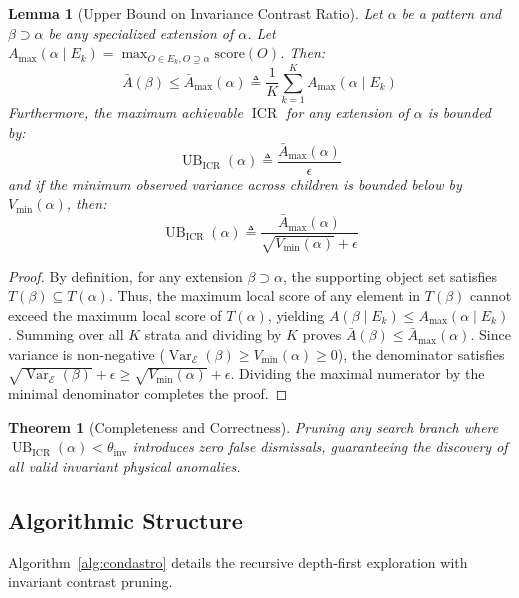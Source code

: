 \documentclass[10pt,a4paper]{article}
\newtheorem{lemma}{Lemma}
\newtheorem{theorem}{Theorem}
\begin{document}
\begin{lemma}[Upper Bound on Invariance Contrast Ratio]
\label{lem:bound}
Let $\alpha$ be a pattern and $\beta \supset \alpha$ be any specialized extension of $\alpha$. Let $A_{\max}(\alpha \mid E_k) = \max_{O \in E_k, O \supseteq \alpha} \text{score}(O)$. Then:
\begin{equation}
    \bar{A}(\beta) \le \bar{A}_{\max}(\alpha) \triangleq \frac{1}{K} \sum_{k=1}^K A_{\max}(\alpha \mid E_k)
\end{equation}
Furthermore, the maximum achievable $\operatorname{ICR}$ for any extension of $\alpha$ is bounded by:
\begin{equation}
    \operatorname{UB}_{\text{ICR}}(\alpha) \triangleq \frac{\bar{A}_{\max}(\alpha)}{\epsilon}
\end{equation}
and if the minimum observed variance across children is bounded below by $V_{\min}(\alpha)$, then:
\begin{equation}
    \operatorname{UB}_{\text{ICR}}(\alpha) \triangleq \frac{\bar{A}_{\max}(\alpha)}{\sqrt{V_{\min}(\alpha)} + \epsilon}
\end{equation}
\end{lemma}

\begin{proof}
By definition, for any extension $\beta \supset \alpha$, the supporting object set satisfies $T(\beta) \subseteq T(\alpha)$. Thus, the maximum local score of any element in $T(\beta)$ cannot exceed the maximum local score of $T(\alpha)$, yielding $A(\beta \mid E_k) \le A_{\max}(\alpha \mid E_k)$. Summing over all $K$ strata and dividing by $K$ proves $\bar{A}(\beta) \le \bar{A}_{\max}(\alpha)$. Since variance is non-negative ($\operatorname{Var}_{\mathcal{E}}(\beta) \ge V_{\min}(\alpha) \ge 0$), the denominator satisfies $\sqrt{\operatorname{Var}_{\mathcal{E}}(\beta)} + \epsilon \ge \sqrt{V_{\min}(\alpha)} + \epsilon$. Dividing the maximal numerator by the minimal denominator completes the proof.
\end{proof}

\begin{theorem}[Completeness and Correctness]
Pruning any search branch where $\operatorname{UB}_{\text{ICR}}(\alpha) < \theta_{\text{inv}}$ introduces zero false dismissals, guaranteeing the discovery of all valid invariant physical anomalies.
\end{theorem}

\subsection{Algorithmic Structure}
Algorithm~\ref{alg:condastro} details the recursive depth-first exploration with invariant contrast pruning.
\end{document}

